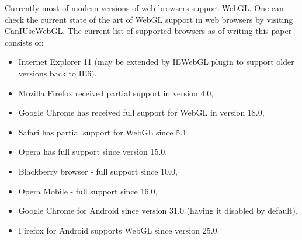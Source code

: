 Currently most of modern versions of web browsers support WebGL.
One can check the current state of the art of WebGL support in web browsers by visiting CanIUseWebGL\cite{webgl_support}.
The current list of supported browsers as of writing this paper consists of:
\begin{itemize}
\item Internet Explorer 11 (may be extended by IEWebGL plugin \cite{iewebgl} to support older versions back to IE6),
\item Mozilla Firefox received partial support in version 4.0,
\item Google Chrome has received full support for WebGL in version 18.0,
\item Safari has partial support for WebGL since 5.1,
\item Opera has full support since version 15.0,
\item Blackberry browser - full support since 10.0,
\item Opera Mobile - full support since 16.0,
\item Google Chrome for Android since version 31.0 (having it disabled by default),
\item Firefox for Android supports WebGL since version 25.0.
\end{itemize}